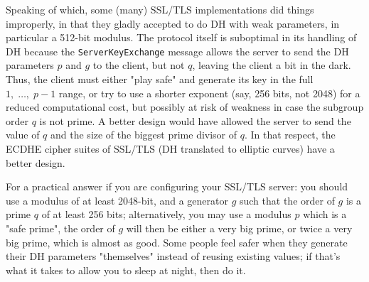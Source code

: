 Speaking of which, some (many) SSL/TLS implementations did things improperly, in that they
gladly accepted to do DH with weak parameters, in particular a 512-bit modulus.
The protocol itself is suboptimal in its handling of DH because the \texttt{ServerKeyExchange}
message allows the server to send the DH parameters $p$ and $g$ to the client, but not $q$,
leaving the client a bit in the dark.
Thus, the client must either "play safe" and generate its key in the full $1, \;\dots,\; p-1$ range,
or try to use a shorter exponent (say, 256 bits, not 2048) for a reduced computational cost,
but possibly at risk of weakness in case the subgroup order $q$ is not prime.
A better design would have allowed the server to send the value of $q$ and the size of the
biggest prime divisor of $q$.
In that respect, the ECDHE cipher suites of SSL/TLS (DH translated to elliptic curves)
have a better design.

For a practical answer if you are configuring your SSL/TLS server:
you should use a modulus of at least 2048-bit, and a generator $g$ such that the order
of $g$ is a prime $q$ of at least 256 bits;
alternatively, you may use a modulus $p$ which
is a "safe prime", the order of $g$ will then be either a very big prime, or twice
a very big prime, which is almost as good.
Some people feel safer when they generate their DH parameters
"themselves" instead of reusing existing values;
if that's what it takes
to allow you to sleep at night, then do it.

